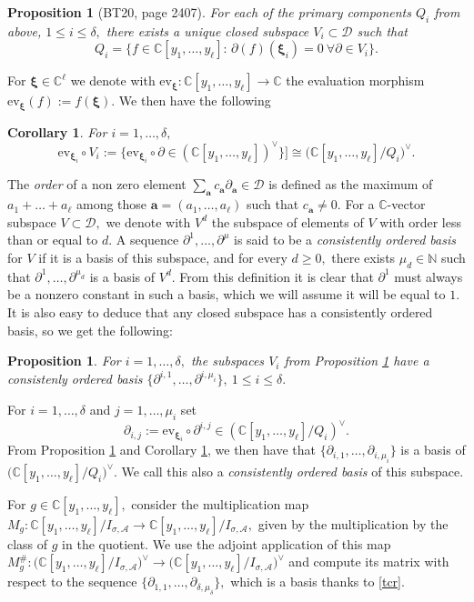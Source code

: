 \documentclass[a4paper,11pt]{amsart}
\newcommand{\C}{\mathbb{C}}
\newcommand{\N}{\mathbb{N}}
\newcommand{\cA}{{\mathcal A}}
\newcommand{\cD}{{\mathcal D}}
\newcommand{\bfa}{{\boldsymbol{a}}}
\newcommand{\bfxi}{{\boldsymbol{\xi}}}
\newcounter{thm}
\numberwithin{thm}{section}
\numberwithin{equation}{section}
\theoremstyle{definition}
\theoremstyle{plain}
\newtheorem{proposition}[thm]{Proposition}
\newtheorem{corollary}[thm]{Corollary}
\begin{document}
\begin{proposition}[BT20, page 2407]\label{bfr}
For each of the primary components $Q_i$ from above, $1\leq i\leq\delta,$ there exists a unique closed subspace $V_i\subset\cD$ such that
$$Q_i=\{f\in\C[y_1,\ldots, y_\ell]:\, \partial(f)(\bfxi_i)=0 \ \forall \partial\in V_i\}.
$$
\end{proposition}
For $\bfxi\in\C^\ell$ we denote with $\mbox{ev}_\bfxi:\C[y_1,\ldots, y_\ell]\to\C$ the evaluation morphism $\mbox{ev}_\bfxi(f):=f(\bfxi).$ We then have the following
\begin{corollary}\label{dual}
For $i=1,\ldots, \delta,$
$$\mbox{ev}_{\bfxi_i}\circ V_i:=\{\mbox{ev}_{\bfxi_i}\circ\partial \in(\C[y_1,\ldots,y_\ell]) ^\vee\}]\cong \Big(\C[y_1,\ldots, y_\ell]/ Q_i\Big)^\vee.$$
\end{corollary}
The \textit{order} of a non zero  element $\sum_\bfa c_\bfa\partial_\bfa\in\cD$ is defined as the maximum of $a_1+\ldots+a_\ell$ among those $\bfa=(a_1,\ldots, a_\ell)$ such that $c_\bfa\neq0.$
For a $\C$-vector subspace $V\subset\cD,$ we denote with $V^d$ the subspace of elements of $V$ with order less than or equal to $d.$
A sequence $\partial^1,\ldots, \partial^\mu$ is said to be a \textit{consistently ordered basis} for $V$ if it is a basis of this subspace, and for every $d\geq0,$ there exists $\mu_d\in\N$ such that 
$\partial^1,\ldots, \partial^{\mu_d}$ is a basis of $V^d.$ From this definition it is clear that $\partial^1$ must always be a nonzero constant in such a basis, which we will assume it will be equal to $1.$ 
It is also easy to deduce that any closed subspace has a consistently ordered basis, so we get the following:
\begin{proposition}\label{cun}
For $i=1,\ldots, \delta,$ the subspaces $V_i$ from Proposition \ref{bfr} have a consistenly ordered basis $\{\partial^{i,1},\ldots, \partial^{i,\mu_i}\},\ 1\leq i\leq\delta.$
\end{proposition}
For $i=1,\ldots, \delta$ and $j=1,\ldots, \mu_i$ set  
\begin{equation}\label{pij}
\partial_{i,j}:=\mbox{ev}_{\bfxi_i}\circ\partial^{i,j}\in  (\C[y_1,\ldots, y_\ell]/ Q_i)^\vee.
\end{equation}
From Proposition \ref{cun} and Corollary \ref{dual}, we then have that $\{\partial_{i,1},\ldots, \partial_{i,\mu_i}\}$ is a basis of $ \Big(\C[y_1,\ldots, y_\ell]/ Q_i\Big)^\vee.$ We call this also a \textit{consistently ordered basis} of this subspace.

For $g\in\C[y_1,\ldots, y_\ell],$ consider the multiplication map $M_g:\C[y_1,\ldots, y_\ell]/I_{\sigma,\cA}\to\C[y_1,\ldots, y_\ell]/I_{\sigma,\cA},$ given by the multiplication by the class of $g$ in the quotient. We use the adjoint application of this map $M^{\#}_g:\Big(\C[y_1,\ldots, y_\ell]/I_{\sigma,\cA}\Big)^\vee\to\Big(\C[y_1,\ldots, y_\ell]/I_{\sigma,\cA}\Big)^\vee$ and compute its matrix with respect to the sequence  $\{\partial_{1,1},\ldots, \partial_{\delta,\mu_\delta}\},$ which is a basis thanks to \eqref{tcr}.
\end{document}
